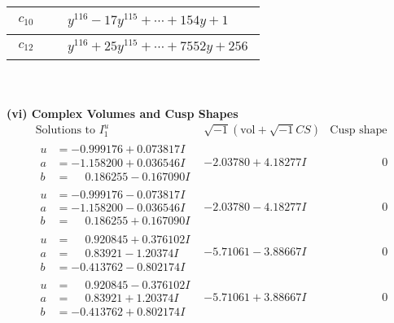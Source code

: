 \documentclass[1p]{elsarticle_modified}
\theoremstyle{definition}
\newcommand{\I}{\sqrt{-1}}
\begin{document}
\begin{tabular}{m{50pt}|m{274pt}}
\hline $$\begin{aligned}c_{10}\end{aligned}$$&$\begin{aligned}
&y^{116}-17 y^{115}+\cdots+154 y+1
\end{aligned}$\\
\hline $$\begin{aligned}c_{12}\end{aligned}$$&$\begin{aligned}
&y^{116}+25 y^{115}+\cdots+7552 y+256
\end{aligned}$\\
\hline
\end{tabular}\\~\\
\newpage\flushleft \textbf{(vi) Complex Volumes and Cusp Shapes}
$$\begin{array}{c|c|c}  
\text{Solutions to }I^u_{1}& \I (\text{vol} + \sqrt{-1}CS) & \text{Cusp shape}\\
 \hline 
\begin{aligned}
u &= -0.999176 + 0.073817 I \\
a &= -1.158200 + 0.036546 I \\
b &= \phantom{-}0.186255 - 0.167090 I\end{aligned}
 & -2.03780 + 4.18277 I & \phantom{-0.000000 } 0 \\ \hline\begin{aligned}
u &= -0.999176 - 0.073817 I \\
a &= -1.158200 - 0.036546 I \\
b &= \phantom{-}0.186255 + 0.167090 I\end{aligned}
 & -2.03780 - 4.18277 I & \phantom{-0.000000 } 0 \\ \hline\begin{aligned}
u &= \phantom{-}0.920845 + 0.376102 I \\
a &= \phantom{-}0.83921 - 1.20374 I \\
b &= -0.413762 - 0.802174 I\end{aligned}
 & -5.71061 - 3.88667 I & \phantom{-0.000000 } 0 \\ \hline\begin{aligned}
u &= \phantom{-}0.920845 - 0.376102 I \\
a &= \phantom{-}0.83921 + 1.20374 I \\
b &= -0.413762 + 0.802174 I\end{aligned}
 & -5.71061 + 3.88667 I & \phantom{-0.000000 } 0 \\ \hline\begin{aligned}

\end{aligned}
\end{array}$$
\end{document}
